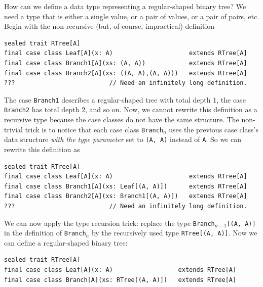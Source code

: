 How can we define a data type representing a regular-shaped binary
tree? We need a type that is either a single value, or a pair of values,
or a pair of pairs, etc. Begin with the non-recursive (but, of course,
impractical) definition
\begin{lstlisting}
sealed trait RTree[A]
final case class Leaf[A](x: A)                     extends RTree[A]
final case class Branch1[A](xs: (A, A))            extends RTree[A]
final case class Branch2[A](xs: ((A, A),(A, A)))   extends RTree[A]
???                          // Need an infinitely long definition.
\end{lstlisting}
The case \lstinline!Branch1! describes a regular-shaped tree with
total depth $1$, the case \lstinline!Branch2! has total depth $2$,
and so on. Now, we cannot rewrite this definition as a recursive type
because the case classes do not have the same structure. The non-trivial
trick is to notice that each case class \lstinline!Branch!$_{n}$
uses the previous case class's data structure \emph{with the type
parameter} set to \lstinline!(A, A)! instead of \lstinline!A!. So
we can rewrite this definition as
\begin{lstlisting}
sealed trait RTree[A]
final case class Leaf[A](x: A)                     extends RTree[A]
final case class Branch1[A](xs: Leaf[(A, A)])      extends RTree[A]
final case class Branch2[A](xs: Branch1[(A, A)])   extends RTree[A]
???                          // Need an infinitely long definition.
\end{lstlisting}
We can now apply the type recursion trick: replace the type \lstinline!Branch!$_{n-1}$\lstinline![(A, A)]!
in the definition of \lstinline!Branch!$_{n}$ by the recursively
used type \lstinline!RTree[(A, A)]!. Now we can define a regular-shaped
binary tree:
\begin{lstlisting}
sealed trait RTree[A]
final case class Leaf[A](x: A)                  extends RTree[A]
final case class Branch[A](xs: RTree[(A, A)])   extends RTree[A]
\end{lstlisting}

